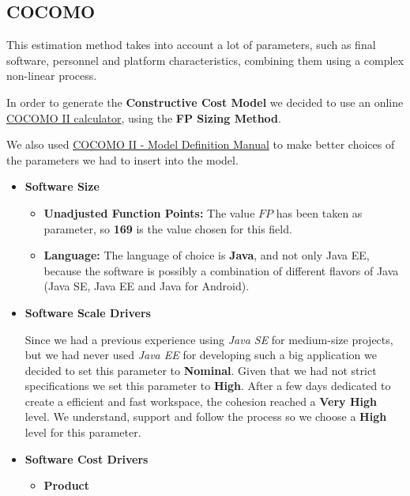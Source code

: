 \subsection{COCOMO}
This estimation method takes into account a lot of parameters, such as final software, personnel and platform characteristics, combining them using a complex non-linear process.\par
In order to generate the \textbf{Constructive Cost Model} we decided to use an online \href{http://csse.usc.edu/tools/COCOMOII.php}{COCOMO II calculator}, using the \textbf{FP Sizing Method}.\par
We also used \href{http://csse.usc.edu/csse/research/COCOMOII/cocomo2000.0/CII_modelman2000.0.pdf}{COCOMO II - Model Definition Manual} to make better choices of the parameters we had to insert into the model.
\begin{itemize}
	\item \textbf{Software Size}
	\begin{itemize}
		\item \textbf{Unadjusted Function Points:} The value $FP$ has been taken as parameter, so \textbf{169} is the value chosen for this field.
		\item \textbf{Language:} The language of choice is \textbf{Java}, and not only Java EE, because the software is possibly a combination of different flavors of Java (Java SE, Java EE and Java for Android).
	\end{itemize}
	\item \textbf{Software Scale Drivers}
	\begin{itemize}
		 Since we had a previous experience using \textit{Java SE} for medium-size projects, but we had never used \textit{Java EE} for developing such a big application we decided to set this parameter to \textbf{Nominal}.
		 Given that we had not strict specifications we set this parameter to \textbf{High}.
		 After a few days dedicated to create a efficient and fast workspace, the cohesion reached a \textbf{Very High} level.
		 We understand, support and follow the process so we choose a \textbf{High} level for this parameter.
	\end{itemize}
	\item \textbf{Software Cost Drivers}
	\begin{itemize}
		\item \textbf{Product}

\end{itemize}
\end{itemize}
